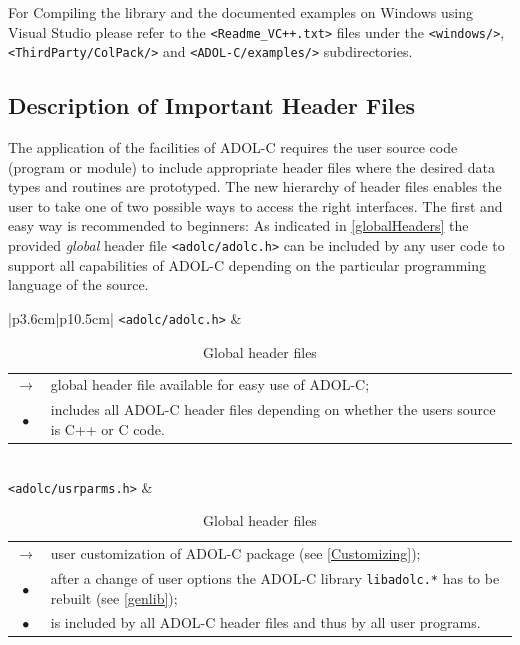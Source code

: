 \documentclass[11pt,twoside]{article}
\begin{document}
For Compiling the library and the documented examples on Windows using
Visual Studio please refer to the \verb=<Readme_VC++.txt>= files under 
the \verb=<windows/>=, \verb=<ThirdParty/ColPack/>= and 
\verb=<ADOL-C/examples/>= subdirectories.
%
\subsection{Description of Important Header Files}
\label{ssec:DesIH}
%
The application of the facilities of ADOL-C requires the user 
source code (program or module) to include appropriate 
header files where the desired data types and routines are 
prototyped. The new hierarchy of header files enables the user
to take one of two possible ways to access the right interfaces.
The first and easy way is recommended to beginners: As indicated in
\autoref{globalHeaders} the provided {\em global} header file 
\verb=<adolc/adolc.h>= can be included by any user code to support all
capabilities of ADOL-C depending on the particular programming language
of the source.    

\begin{table}[h]
\center \small
\begin{tabular}{|p{3.6cm}|p{10.5cm}|}\hline
\verb=<adolc/adolc.h>= & 
\begin{tabular*}{10.5cm}{cp{9.5cm}}
  \boldmath $\rightarrow$ \unboldmath
                 & global header file available for easy use of ADOL-C; \\
  $\bullet$      & includes all ADOL-C header files depending on
                   whether the users source is C++ or C code.
\end{tabular*}
\\ \hline
\verb=<adolc/usrparms.h>= &
\begin{tabular*}{10.5cm}{cp{9.5cm}}
  \boldmath $\rightarrow$ \unboldmath
                 & user customization of ADOL-C package (see
                   \autoref{Customizing}); \\
  $\bullet$      & after a change of
                   user options the ADOL-C library \verb=libadolc.*=
                   has to be rebuilt (see \autoref{genlib}); \\
  $\bullet$      & is included by all ADOL-C header files and thus by all user
                   programs.
\end{tabular*} \\ \hline
\end{tabular}
\caption{Global header files}
\label{globalHeaders}
\end{table}  
\end{document}
